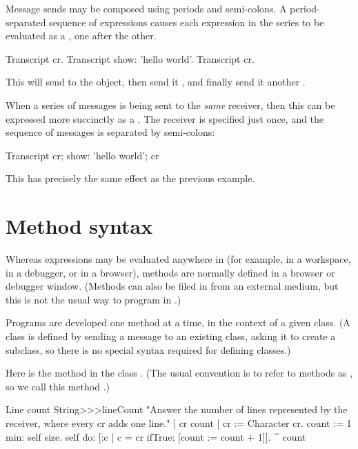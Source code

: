 \documentclass[a4paper,10pt,twoside]{book}
\begin{document}
Message sends may be composed using periods and semi-colons.
A period-separated sequence of expressions causes each expression in the series to be evaluated as a , one after the other.

\begin{code}{}
Transcript cr.
Transcript show: 'hello world'.
Transcript cr.
\end{code}

\noindent
This will send  to the  object, then send it , and finally send it another .

When a series of messages is being sent to the \emph{same} receiver, then this can be expressed more succinctly as a .
The receiver is specified just once, and the sequence of messages is separated by semi-colons:

\begin{code}{}
Transcript 
	cr;
    show: 'hello world';
    cr
\end{code}
This has precisely the same effect as the previous example.

\section{Method syntax}

Whereas expressions may be evaluated anywhere in \sq (for example, in a workspace, in a debugger, or in a browser), methods are normally defined in a browser or debugger window.
(Methods can also be filed in from an external medium, but this is not the usual way to program in \sq.)

Programs are developed one method at a time, in the context of a given class.
(A class is defined by sending a message to an existing class, asking it to create a subclass, so there is no special syntax required for defining classes.)

Here is the method  in the class .
(The usual convention is to refer to methods as , so we call this method .)

\begin{method}[lineCount]{Line count}
String>>>lineCount
   "Answer the number of lines represented by the receiver,
   where every cr adds one line."
   | cr count |
   cr := Character cr.
   count := 1 min: self size.
   self do: [:c | 
      c = cr ifTrue: [count := count + 1]].
   ^ count
\end{method}
\end{document}
